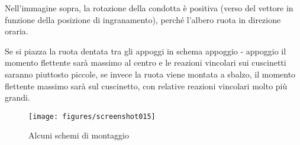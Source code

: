 \documentclass[a4paper, 15pt]{article}
\begin{document}
\begin{adjustwidth}{2in}{}
	Nell'immagine sopra, la rotazione della condotta è positiva (verso del vettore in funzione della posizione di ingranamento), perché l'albero  ruota in direzione oraria.  \newline 
	
	Se si piazza la ruota dentata tra gli appoggi in schema appoggio - appoggio il momento flettente sarà massimo al centro e le reazioni vincolari sui cuscinetti saranno piuttosto piccole, se invece la ruota viene montata a sbalzo, il momento flettente massimo sarà sul cuscinetto, con relative reazioni vincolari molto più grandi. 
	
	\begin{figure}[H]
		\centering
		\texttt{[image: figures/screenshot015]}
		\caption{Alcuni schemi di montaggio}
		\label{fig:screenshot015}
	\end{figure}
		

	
	
	
	





	
	
	
	
				
				
				
				
							 
				  
				 
				 
				 
				
				
				
				
				
				
				
				
				
				
				
			
			
			
			
			
			
			
			
			
			
			
			
			
			
			
			
			
			
			
			
			
			
			
			
			
			
			
			
				
			\end{adjustwidth}	
		
\end{document}
